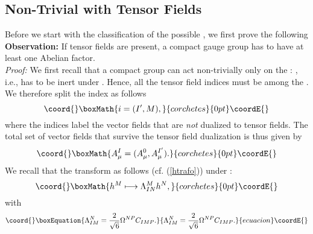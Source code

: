 \documentclass[a4paper,11pt]{article}
\begin{document}
\begin{enumerate}
\end{enumerate}

\subsection{Non-Trivial \coordHE{} with Tensor Fields}


Before we start with the classification of the possible \coordHE{},
we first prove the following
\vspace{2mm} \\
\textbf{Observation:} If tensor fields are present, a compact
gauge group
\coordHE{} has to have at least one Abelian factor.\\
\emph{Proof:} We first recall that a compact group \coordHE{}
can act non-trivially only on the \coordHE{}: \coordHE{}, i.e.,
\coordHE{} has to be inert under \coordHE{}. Hence, all the tensor field
indices
\coordHE{} must be among the
\coordHE{}. We therefore split the index \coordHE{} as
follows
\begin{displaymath}\coord{}\boxMath{
i=(I',M),
}{corchetes}{0pt}\coordE{}\end{displaymath}
where the indices \coordHE{} label the vector
fields \coordHE{} that are \emph{not} dualized to tensor
fields. The total set of vector fields that survive the tensor
field dualization \coordHE{} is thus
given by
\begin{displaymath}\coord{}\boxMath{
A_{\mu}^{I}=(A_{\mu}^{0},A_{\mu}^{I'}).
}{corchetes}{0pt}\coordE{}\end{displaymath}
We recall that the \coordHE{} transform as follows (cf. 
(\ref{htrafo})) under \coordHE{}:
\begin{displaymath}\coord{}\boxMath{
h^{M}\longmapsto \Lambda_{IN}^{M}h^{N},
}{corchetes}{0pt}\coordE{}\end{displaymath}
with
\begin{equation}\coord{}\boxEquation{\label{CLambda2}
\Lambda_{IM}^{N}=\frac{2}{\sqrt{6}}\Omega^{NP}C_{IMP}.
}{\Lambda_{IM}^{N}=\frac{2}{\sqrt{6}}\Omega^{NP}C_{IMP}.
}{ecuacion}\coordE{}\end{equation}
\end{document}
